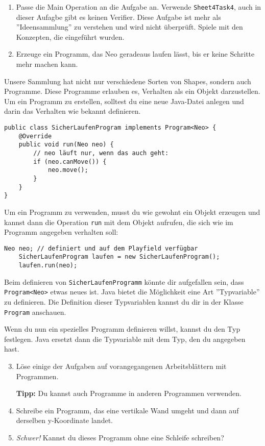 
\begin{enumerate}
	\item Passe die Main Operation an die Aufgabe an.
		Verwende \lstinline{Sheet4Task4}, auch in dieser Aufagbe gibt es keinen Verifier.
		Diese Aufgabe ist mehr als ''Ideensammlung'' zu verstehen und wird nicht überprüft.
		Spiele mit den Konzepten, die eingeführt wurden.
	\item Erzeuge ein Programm, das Neo geradeaus laufen lässt, bis er keine Schritte mehr machen kann.
\end{enumerate}

\begin{Infobox}[Programme]
	Unsere Sammlung hat nicht nur verschiedene Sorten von Shapes, sondern auch Programme.
	Diese Programme erlauben es, Verhalten als ein Objekt darzustellen.
	Um ein Programm zu erstellen, solltest du eine neue Java-Datei anlegen und darin das Verhalten wie bekannt definieren.

	\begin{lstlisting}[title=SicherLaufenProgram.java, numbers=none,xleftmargin=0.5cm]
public class SicherLaufenProgram implements Program<Neo> {
	@Override
	public void run(Neo neo) {
		// neo läuft nur, wenn das auch geht:
		if (neo.canMove()) {
			neo.move();
		}
	}
}
	\end{lstlisting}

	Um ein Programm zu verwenden, musst du wie gewohnt ein Objekt erzeugen und kannst dann die Operation \lstinline{run} mit dem Objekt aufrufen, die sich wie im Programm angegeben verhalten soll:

	\begin{lstlisting}[numbers=none,xleftmargin=0.5cm]
	Neo neo; // definiert und auf dem Playfield verfügbar
	SicherLaufenProgram laufen = new SicherLaufenProgram();
	laufen.run(neo);
	\end{lstlisting}
\end{Infobox}

\begin{Infobox}
	Beim definieren von \lstinline{SicherLaufenProgramm} könnte dir aufgefallen sein, dass \mbox{\lstinline{Program<Neo>}} etwas neues ist.
	Java bietet die Möglichkeit eine Art ''Typvariable'' zu definieren.
	Die Definition dieser Typvariablen kannst du dir in der Klasse \lstinline{Program} anschauen.

	Wenn du nun ein spezielles Programm definieren willst, kannst du den Typ festlegen.
	Java ersetzt dann die Typvariable mit dem Typ, den du angegeben hast.
\end{Infobox}

\begin{enumerate}\setcounter{enumi}{2}
	\item Löse einige der Aufgaben auf vorangegangenen Arbeitsblättern mit Programmen.
	
	\textbf{Tipp:} Du kannst auch Programme in anderen Programmen verwenden.
	\item Schreibe ein Programm, das eine vertikale Wand umgeht und dann auf derselben y-Koordinate landet.
	\item \optional \emph{Schwer!} Kannst du dieses Programm ohne eine Schleife schreiben?
\end{enumerate}
